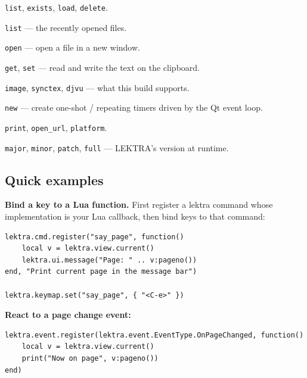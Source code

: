 \documentclass[a4paper,12pt]{article}
\begin{document}
\begin{description}[leftmargin=0pt]
    \item[\texttt{lektra.\allowbreak{}sessions}] \texttt{list}, \texttt{exists}, \texttt{load}, \texttt{delete}.
    \item[\texttt{lektra.recent\_\allowbreak{}files}] \texttt{list} — the recently opened files.
    \item[\texttt{lektra.\allowbreak{}window}] \texttt{open} — open a file in a new window.
    \item[\texttt{lektra.\allowbreak{}clipboard}] \texttt{get}, \texttt{set} — read and write the text on the clipboard.
    \item[\texttt{lektra.\allowbreak{}capabilities}] \texttt{image}, \texttt{synctex}, \texttt{djvu} — what this build supports.
    \item[\texttt{lektra.\allowbreak{}timer}] \texttt{new} — create one-shot / repeating timers driven by the Qt event loop.
    \item[\texttt{lektra.\allowbreak{}utils}] \texttt{print}, \texttt{open\_\allowbreak{}url}, \texttt{platform}.
    \item[\texttt{lektra.\allowbreak{}version}] \texttt{major}, \texttt{minor}, \texttt{patch}, \texttt{full} — LEKTRA's version at runtime.
\end{description}

\subsection{Quick examples}

\textbf{Bind a key to a Lua function.} First register a lektra command whose implementation is your Lua callback, then bind keys to that command:

\begin{tcolorbox}[colback=gray!5, colframe=gray!40, boxrule=0.4pt, arc=4pt,
    fontupper=\ttfamily\small]
\begin{verbatim}
lektra.cmd.register("say_page", function()
    local v = lektra.view.current()
    lektra.ui.message("Page: " .. v:pageno())
end, "Print current page in the message bar")

lektra.keymap.set("say_page", { "<C-e>" })
\end{verbatim}
\end{tcolorbox}

\textbf{React to a page change event:}

\begin{tcolorbox}[colback=gray!5, colframe=gray!40, boxrule=0.4pt, arc=4pt,
    fontupper=\ttfamily\small]
\begin{verbatim}
lektra.event.register(lektra.event.EventType.OnPageChanged, function()
    local v = lektra.view.current()
    print("Now on page", v:pageno())
end)
\end{verbatim}
\end{tcolorbox}
\end{document}
